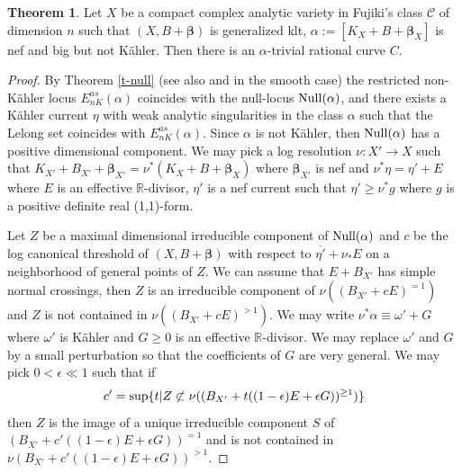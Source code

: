 \documentclass[11pt]{amsart}
\numberwithin{equation}{section}
\def\bbeta{\boldsymbol{\beta}}
\newcommand\R{{\mathbb{R}}}
\theoremstyle{definition}
\theoremstyle{definition}
\newtheorem{theorem}{Theorem}[section]
\theoremstyle{definition}
\begin{document}
\begin{theorem} 
\label{t-ray}%
Let $X$ be a compact complex analytic variety in Fujiki's class $\mathcal C$ of dimension $n$ such that $(X,B+\bbeta)$ is generalized klt, $\alpha:=[K_X+B+\bbeta _X]$ is nef and big but not K\"ahler. Then there is an $\alpha $-trivial  rational curve $C$.
\end{theorem}
\begin{proof} 
 By Theorem \ref{t-null} (see also \cite[Theorem 1.1]{CT15} and \cite[Theorem 3.17]{Bou04} in the smooth case) the restricted non-K\"ahler locus
${ E_{nK}^{as}} (\alpha)$ coincides with the null-locus  ${\rm Null}(\alpha)$, and 
there exists a K\"ahler current $\eta$ with weak analytic singularities in the class $\alpha$ such that
the Lelong set coincides with ${ E_{nK}^{as}} (\alpha)$. 
Since $\alpha $ is not K\"ahler, then ${\rm Null}(\alpha)$ has a positive dimensional component.
We may pick a log resolution $\nu :X'\to X$ such that $K_{X'}+B_{X'}+\bbeta _{X'}=\nu ^*(K_X+B+\bbeta _X)$ where $\bbeta _{X'}$ is nef and
$\nu ^*\eta=\eta' +E$ where $E$ is an effective $\R$-divisor, $\eta'$ is a nef current such that $\eta'\geq \nu ^*g$ where $g$ is a positive definite real (1,1)-form.


Let $Z$ be a maximal dimensional irreducible component of ${\rm Null}(\alpha)$ and $c$ be the log canonical threshold of $(X,B+\bbeta)$ with respect to   $\overline{\eta'}+\nu_*E$ on a neighborhood of general points of $Z$. We can assume that  $E+B_{X'}$ has simple normal crossings, then $Z$ is an irreducible component of $\nu ((B_{X'}+cE)^{=1})$ and $Z$ is not contained in $\nu ((B_{X'}+cE)^{>1})$. %
We may write $\nu ^*\alpha \equiv \omega '+G$ where $\omega '$ is K\"ahler and $G\geq 0$ is an effective $\R$-divisor. We may replace $\omega '$ and $G$ by a small perturbation so that the coefficients of $G$ are very general.
We may pick $0<\epsilon \ll 1$ such that if \[c'={\rm sup}\{ t|Z\not\subset \nu ((B_{X'}+t((1-\epsilon)E+\epsilon G))^{\geq 1}) \}\]
then $Z$ is the image of a unique irreducible component $S$ of $(B_{X'}+c'((1-\epsilon)E+\epsilon G))^{=1}$ and is not contained in $\nu(B_{X'}+c'((1-\epsilon)E+\epsilon G))^{>1}$.


\end{proof}
\end{document}
